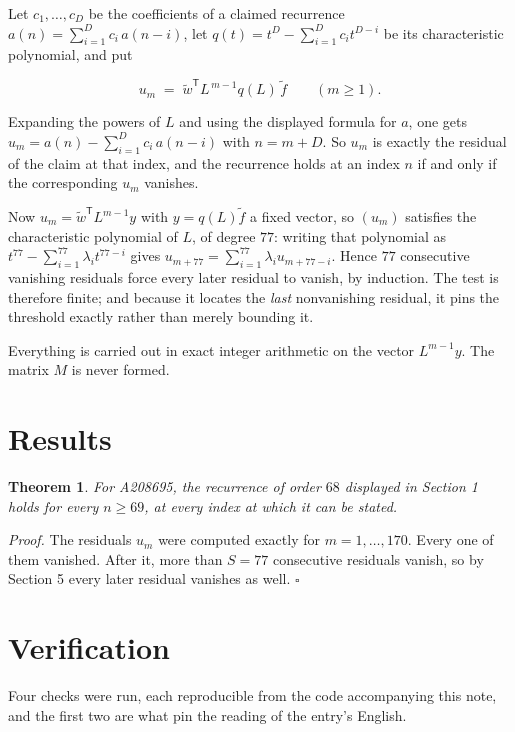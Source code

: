 \documentclass[11pt]{article}
\newtheorem{theorem}{Theorem}
\theoremstyle{definition}
\begin{document}
Let $c_1,\dots,c_D$ be the coefficients of a claimed recurrence $a(n) = \sum_{i=1}^{D} c_i\,a(n-i)$, let $q(t) = t^{D} - \sum_{i=1}^{D} c_i t^{D-i}$ be its characteristic polynomial, and put

\[u_m \;=\; \tilde w^{\mathsf T} L^{\,m-1} q(L)\,\tilde f \qquad (m \ge 1).\]

Expanding the powers of $L$ and using the displayed formula for $a$, one gets $u_m = a(n) - \sum_{i=1}^{D} c_i\,a(n-i)$ with $n = m + D$. So $u_m$ is exactly the residual of the claim at that index, and the recurrence holds at an index $n$ if and only if the corresponding $u_m$ vanishes.

Now $u_m = \tilde w^{\mathsf T} L^{m-1} y$ with $y = q(L)\tilde f$ a fixed vector, so $(u_m)$ satisfies the characteristic polynomial of $L$, of degree $77$: writing that polynomial as $t^{77} - \sum_{i=1}^{77} \lambda_i t^{77-i}$ gives $u_{m+77} = \sum_{i=1}^{77} \lambda_i u_{m+77-i}$. Hence $77$ consecutive vanishing residuals force every later residual to vanish, by induction. The test is therefore finite; and because it locates the {\itshape last} nonvanishing residual, it pins the threshold exactly rather than merely bounding it.

Everything is carried out in exact integer arithmetic on the vector $L^{m-1}y$. The matrix $M$ is never formed.

\section{Results}

\begin{theorem} For A208695, the recurrence of order $68$ displayed in Section 1 holds for every $n \ge 69$, at every index at which it can be stated.\end{theorem}

{\itshape Proof.} The residuals $u_m$ were computed exactly for $m = 1,\dots,170$. Every one of them vanished. After it, more than $S = 77$ consecutive residuals vanish, so by Section 5 every later residual vanishes as well. $\square$

\section{Verification}

Four checks were run, each reproducible from the code accompanying this note, and the first two are what pin the reading of the entry's English.
\end{document}
